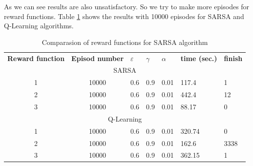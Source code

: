 \documentclass[a4paper, twoside, english]{article}
\begin{document}
As we can see results are also unsatisfactory. So we try to make more episodes for reward functions.  Table \ref{table:3} shows the results with 10000 episodes for SARSA and Q-Learning algorithms.\\
\begin{table}[h!]
	\begin{tabular}{cccccll}
		\multicolumn{1}{l}{\textbf{Reward function}} & \textbf{Episod number} & \multicolumn{1}{l}{\textbf{$\varepsilon$}} & \multicolumn{1}{l}{\textbf{$\gamma$}} & \multicolumn{1}{l}{\textbf{$\alpha$}} & \textbf{time (sec.)} & \textbf{finish} \\
		\multicolumn{7}{c}{\cellcolor[HTML]{CBCEFB}SARSA}                                                                                                                                                                               \\
		1                                            & 10000                  & 0.6                                  & 0.9                                & 0.01                               & 117.4                & 1               \\
		2                                            & 10000                  & 0.6                                  & 0.9                                & 0.01                               & 442.4                & 12              \\
		3                                            & 10000                  & 0.6                                  & 0.9                                & 0.01                               & 88.17                & 0               \\
		\multicolumn{7}{c}{\cellcolor[HTML]{CBCEFB}Q-Learning}                                                                                                                                                                          \\
		1                                            & 10000                  & 0.6                                  & 0.9                                & 0.01                               & 320.74               & 0               \\
		2                                            & 10000                  & 0.6                                  & 0.9                                & 0.01                               & 162.6                & 3338            \\
		3                                            & 10000                  & 0.6                                  & 0.9                                & 0.01                               & 362.15               & 1              
	\end{tabular}
	\caption{Comparasion of reward functions for SARSA algorithm}
	\label{table:3}
\end{table}
\end{document}
